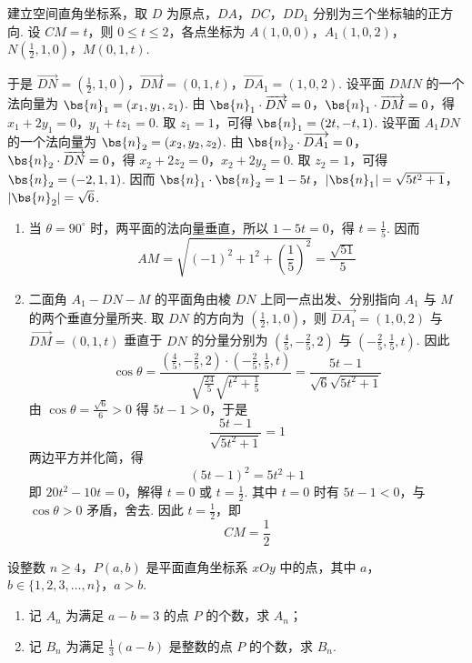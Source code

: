 \begin{solution}
建立空间直角坐标系，取 \(D\) 为原点，\(DA\)，\(DC\)，\(DD_1\) 分别为三个坐标轴的正方向. 设 \(CM=t\)，则 \(0\leqslant t\leqslant2\)，各点坐标为
\(A(1,0,0)\)，\(A_1(1,0,2)\)，\(N\left(\frac{1}{2},1,0\right)\)，\(M(0,1,t)\).

于是 \(\overrightarrow{DN}=\left(\frac{1}{2},1,0\right)\)，\(\overrightarrow{DM}=(0,1,t)\)，\(\overrightarrow{DA_1}=(1,0,2)\).
设平面 \(DMN\) 的一个法向量为 \(\bs{n}_1=(x_1,y_1,z_1)\). 由
\(\bs{n}_1\cdot\overrightarrow{DN}=0\)，\(\bs{n}_1\cdot\overrightarrow{DM}=0\)，得
\(x_1+2y_1=0\)，\(y_1+tz_1=0\).
取 \(z_1=1\)，可得 \(\bs{n}_1=(2t,-t,1)\). 设平面 \(A_1DN\) 的一个法向量为 \(\bs{n}_2=(x_2,y_2,z_2)\). 由
\(\bs{n}_2\cdot\overrightarrow{DA_1}=0\)，\(\bs{n}_2\cdot\overrightarrow{DN}=0\)，得
\(x_2+2z_2=0\)，\(x_2+2y_2=0\).
取 \(z_2=1\)，可得 \(\bs{n}_2=(-2,1,1)\). 因而
\(\bs{n}_1\cdot\bs{n}_2=1-5t\)，\(\lvert\bs{n}_1\rvert=\sqrt{5t^2+1}\)，\(\lvert\bs{n}_2\rvert=\sqrt{6}\).

\begin{enumerate}
\item 当 \(\theta=90^\circ\) 时，两平面的法向量垂直，所以 \(1-5t=0\)，得 \(t=\frac{1}{5}\). 因而
\[
AM=\sqrt{(-1)^2+1^2+\left(\frac{1}{5}\right)^2}=\frac{\sqrt{51}}{5}
\]

\item 二面角 \(A_1-DN-M\) 的平面角由棱 \(DN\) 上同一点出发、分别指向 \(A_1\) 与 \(M\) 的两个垂直分量所夹. 取 \(DN\) 的方向为 \(\left(\frac12,1,0\right)\)，则 \(\overrightarrow{DA_1}=(1,0,2)\) 与 \(\overrightarrow{DM}=(0,1,t)\) 垂直于 \(DN\) 的分量分别为 \(\left(\frac45,-\frac25,2\right)\) 与 \(\left(-\frac25,\frac15,t\right)\). 因此
\[
\cos\theta
=\frac{\left(\frac45,-\frac25,2\right)\cdot\left(-\frac25,\frac15,t\right)}
{\sqrt{\frac{24}{5}}\sqrt{t^2+\frac15}}
=\frac{5t-1}{\sqrt{6}\sqrt{5t^2+1}}
\]
由 \(\cos\theta=\frac{\sqrt{6}}{6}>0\) 得 \(5t-1>0\)，于是
\[
\frac{5t-1}{\sqrt{5t^2+1}}=1
\]
两边平方并化简，得
\[
(5t-1)^2=5t^2+1
\]
即 \(20t^2-10t=0\)，解得 \(t=0\) 或 \(t=\frac{1}{2}\). 其中 \(t=0\) 时有 \(5t-1<0\)，与 \(\cos\theta>0\) 矛盾，舍去. 因此 \(t=\frac12\)，即
\[
CM=\frac{1}{2}
\]
\end{enumerate}
\end{solution}

\begin{problem}
设整数 \(n\geqslant 4\)，\(P(a,b)\) 是平面直角坐标系 \(xOy\) 中的点，其中 \(a\)，\(b\in\{1,2,3,\dots,n\}\)，\(a>b\).
\begin{enumerate}
\item 记 \(A_{n}\) 为满足 \(a-b=3\) 的点 \(P\) 的个数，求 \(A_{n}\)；
\item 记 \(B_{n}\) 为满足 \(\frac{1}{3}(a-b)\) 是整数的点 \(P\) 的个数，求 \(B_{n}\).
\end{enumerate}
\end{problem}

